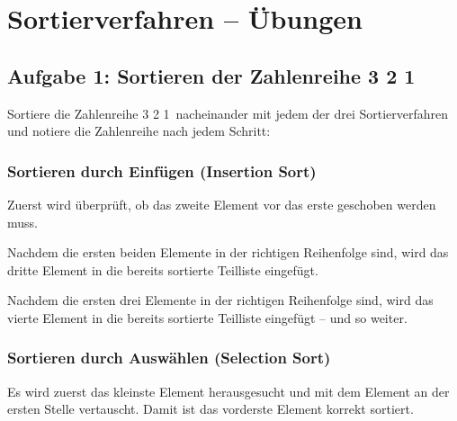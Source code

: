 \clearpage

\rehead[]{\textcolor{lightblue}{AvHG, Inf, My}}
\lohead[]{\textcolor{lightblue}{AvHG, Inf, My}}

\section{Sortierverfahren -- Übungen}

\subsection{Aufgabe 1: Sortieren der Zahlenreihe  3 2 1\grqq}

Sortiere die Zahlenreihe  3 2 1\grqq\ nacheinander mit jedem der drei
Sortierverfahren und notiere die Zahlenreihe nach jedem Schritt:

\subsubsection{Sortieren durch Einfügen (Insertion Sort)}

Zuerst wird überprüft, ob das zweite Element vor das erste geschoben werden
muss.

Nachdem die ersten beiden Elemente in der richtigen Reihenfolge sind, wird das
dritte Element in die bereits sortierte Teilliste eingefügt.

Nachdem die ersten drei Elemente in der richtigen Reihenfolge sind, wird das
vierte Element in die bereits sortierte Teilliste eingefügt -- und so weiter.

\subsubsection{Sortieren durch Auswählen (Selection Sort)}

Es wird zuerst das kleinste Element herausgesucht und mit dem Element an der
ersten Stelle vertauscht. Damit ist das vorderste Element korrekt sortiert.

